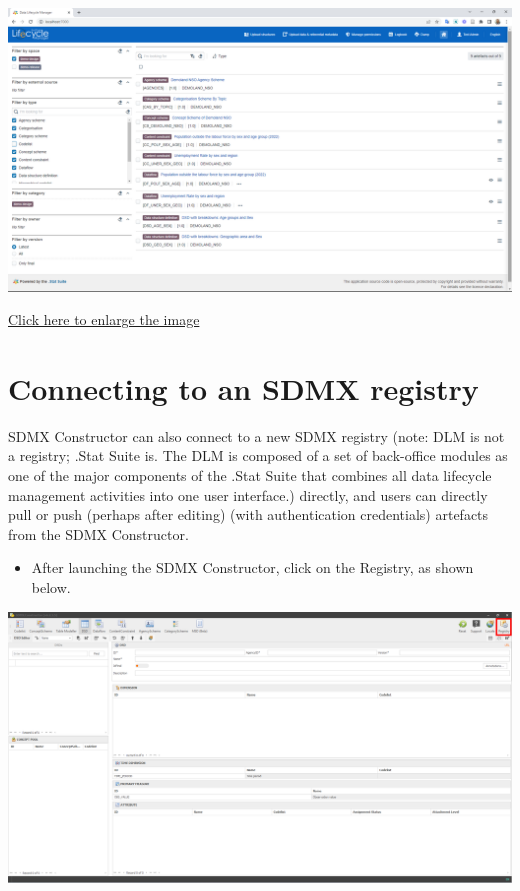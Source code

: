 \documentclass[
]{book}
\providecommand{\tightlist}{%
  \setlength{\itemsep}{0pt}\setlength{\parskip}{0pt}}
\begin{document}
\begin{center}\includegraphics[width=1\linewidth]{./images/image206} \end{center}

\href{images/image206.png}{Click here to enlarge the image}

\hypertarget{connecting-to}{%
\section{Connecting to an SDMX registry}\label{connecting-to}}

SDMX Constructor can also connect to a new SDMX registry (note: DLM is not a registry; .Stat Suite is. The DLM is composed of a set of back-office modules as one of the major components of the .Stat Suite that combines all data lifecycle management activities into one user interface.) directly, and users can directly pull or push (perhaps after editing) (with authentication credentials) artefacts from the SDMX Constructor.

\begin{itemize}
\tightlist
\item
  After launching the SDMX Constructor, click on the Registry, as shown below.
\end{itemize}

\begin{center}\includegraphics[width=1\linewidth]{./images/image208} \end{center}
\end{document}

